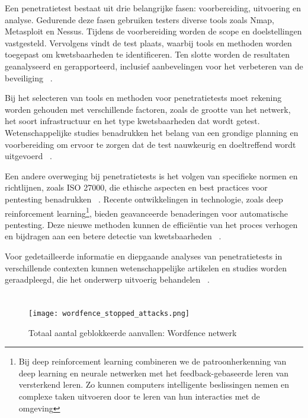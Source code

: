 Een penetratietest bestaat uit drie belangrijke fasen: voorbereiding, uitvoering en analyse. Gedurende deze fasen gebruiken 
testers diverse tools zoals Nmap, Metasploit en Nessus. Tijdens de voorbereiding worden de scope en doelstellingen vastgesteld. 
Vervolgens vindt de test plaats, waarbij tools en methoden worden toegepast om kwetsbaarheden te identificeren. 
Ten slotte worden de resultaten geanalyseerd en gerapporteerd, inclusief aanbevelingen voor het verbeteren van de beveiliging 
~\autocite{Sarker2023}.

Bij het selecteren van tools en methoden voor penetratietests moet rekening worden gehouden met verschillende factoren, zoals de 
grootte van het netwerk, het soort infrastructuur en het type kwetsbaarheden dat wordt getest. Wetenschappelijke studies 
benadrukken het belang van een grondige planning en voorbereiding om ervoor te zorgen dat de test nauwkeurig en doeltreffend 
wordt uitgevoerd ~\autocite{Alhamed2023}.

Een andere overweging bij penetratietests is het volgen van specifieke normen en richtlijnen, zoals ISO 27000, die ethische 
aspecten en best practices voor pentesting benadrukken ~\autocite{DalalanaBertoglio2017}. Recente ontwikkelingen in technologie, zoals deep 
reinforcement learning\footnote{Bij deep reinforcement learning combineren we de patroonherkenning van deep learning en neurale 
netwerken met het feedback-gebaseerde leren van versterkend leren. Zo kunnen computers intelligente beslissingen nemen en complexe 
taken uitvoeren door te leren van hun interacties met de omgeving}, bieden geavanceerde benaderingen voor automatische pentesting. 
Deze nieuwe methoden kunnen de efficiëntie van het proces verhogen en bijdragen aan een betere detectie van kwetsbaarheden 
~\autocite{Yi2023}.

Voor gedetailleerde informatie en diepgaande analyses van penetratietests in verschillende contexten kunnen wetenschappelijke 
artikelen en studies worden geraadpleegd, die het onderwerp uitvoerig behandelen ~\autocite{Sarker2023}.

\section{}
\label{sec:Webomgevingen}

\subsection{}
\label{sec:Veiligheidskwetsbaarheden in Webomgevingen}
\begin{figure}
    \centering
    \texttt{[image: wordfence\_stopped\_attacks.png]}
    \caption[Totaal aantal geblokkeerde aanvallen: Wordfence netwerk]{Totaal aantal geblokkeerde aanvallen: Wordfence netwerk}
\end{figure}

